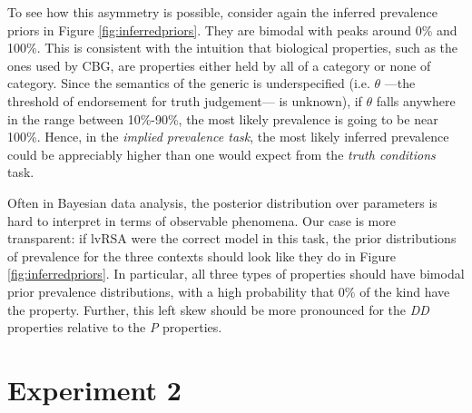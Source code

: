 \documentclass[10pt,letterpaper]{article}
\begin{document}

To see how this asymmetry is possible, consider again the inferred prevalence priors in Figure \ref{fig:inferredpriors}. They are bimodal with peaks around 0\% and 100\%. This is consistent with the intuition that biological properties, such as the ones used by CBG, are properties either held by all of a category or none of category. Since the semantics of the generic is underspecified (i.e. $\theta$ ---the threshold of endorsement for truth judgement--- is unknown), if $\theta$ falls anywhere in the range between 10\%-90\%, the most likely prevalence is going to be near 100\%. Hence, in the \emph{implied prevalence task}, the most likely inferred prevalence could be appreciably higher than one would expect from the \emph{truth conditions} task. 




Often in Bayesian data analysis, the posterior distribution over parameters is hard to interpret in terms of observable phenomena. Our case is more transparent: if lvRSA were the correct model in this task, the prior distributions of prevalence for the three contexts should look like they do in Figure \ref{fig:inferredpriors}. 
In particular, all three types of properties should have bimodal prior prevalence distributions, with a high probability that 0\% of the kind have the property. Further, this left skew should be more pronounced for the \emph{DD} properties relative to the \emph{P} properties. 

\section{Experiment 2}
\end{document}
